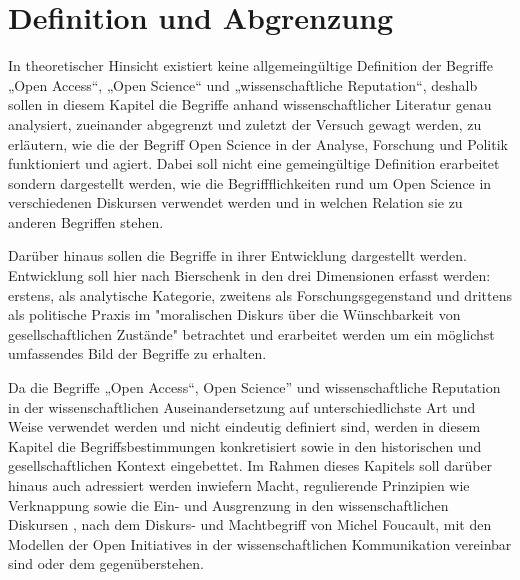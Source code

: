 \chapter{Definition und Abgrenzung} 
In theoretischer Hinsicht existiert keine allgemeingültige Definition der Begriffe „Open Access“, „Open Science“ und „wissenschaftliche Reputation“, deshalb sollen in diesem Kapitel die Begriffe anhand wissenschaftlicher Literatur genau analysiert, zueinander abgegrenzt und zuletzt der Versuch gewagt werden, zu erläutern, wie die der Begriff Open Science in der Analyse, Forschung und Politik funktioniert und agiert. Dabei soll nicht eine gemeingültige Definition erarbeitet sondern dargestellt werden, wie die Begriffflichkeiten rund um Open Science in verschiedenen Diskursen verwendet werden und in welchen Relation sie zu anderen Begriffen stehen.

Darüber hinaus sollen die Begriffe in ihrer Entwicklung dargestellt werden. Entwicklung soll hier nach Bierschenk in den drei Dimensionen erfasst werden: erstens, als analytische Kategorie, zweitens als Forschungsgegenstand und drittens als politische Praxis im "moralischen Diskurs über die Wünschbarkeit von gesellschaftlichen Zustände"  betrachtet und erarbeitet werden um ein möglichst umfassendes Bild der Begriffe zu erhalten. 

Da die Begriffe „Open Access“, Open Science” und wissenschaftliche Reputation in der wissenschaftlichen Auseinandersetzung auf unterschiedlichste Art und Weise verwendet werden und nicht eindeutig definiert sind, werden in diesem Kapitel die Begriffsbestimmungen konkretisiert sowie in den historischen und gesellschaftlichen Kontext eingebettet.
Im Rahmen dieses Kapitels soll darüber hinaus auch adressiert werden inwiefern Macht, regulierende Prinzipien wie Verknappung sowie die Ein- und Ausgrenzung in den wissenschaftlichen Diskursen , nach dem Diskurs- und Machtbegriff  von Michel Foucault, mit den Modellen der Open Initiatives in der wissenschaftlichen Kommunikation vereinbar sind oder dem gegenüberstehen.
